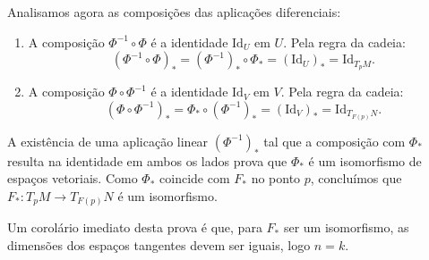 {	Analisamos agora as composições das aplicações diferenciais:
	\begin{enumerate}
		\item A composição $\Phi^{-1} \circ \Phi$ é a identidade $\text{Id}_U$ em $U$. Pela regra da cadeia:
		\begin{equation*}
			(\Phi^{-1} \circ \Phi)_* = (\Phi^{-1})_* \circ \Phi_* = (\text{Id}_U)_* = \text{Id}_{T_p M}.
		\end{equation*}
		\item A composição $\Phi \circ \Phi^{-1}$ é a identidade $\text{Id}_V$ em $V$. Pela regra da cadeia:
		\begin{equation*}
			(\Phi \circ \Phi^{-1})_* = \Phi_* \circ (\Phi^{-1})_* = (\text{Id}_V)_* = \text{Id}_{T_{F(p)} N}.
		\end{equation*}
	\end{enumerate}
	
	A existência de uma aplicação linear $(\Phi^{-1})_*$ tal que a composição com $\Phi_*$ resulta na identidade em ambos os lados prova que $\Phi_*$ é um isomorfismo de espaços vetoriais. Como $\Phi_*$ coincide com $F_*$ no ponto $p$, concluímos que $F_* : T_p M \to T_{F(p)} N$ é um isomorfismo.
	
	Um corolário imediato desta prova é que, para $F_*$ ser um isomorfismo, as dimensões dos espaços tangentes devem ser iguais, logo $n = k$.
}
